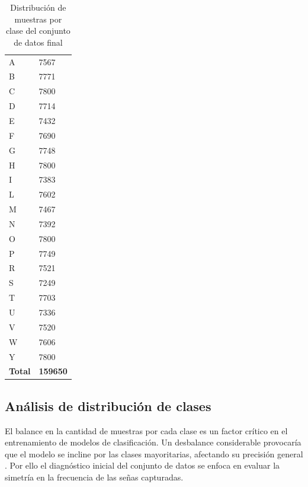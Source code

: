 	\begin{table}[H]
		\centering
		
		
		\caption{Distribución de muestras por clase del conjunto de datos final}
		\label{tab:dataset_general}
		
		\small
		\renewcommand{\arraystretch}{1.2}
		
		\begin{tabular}{|p{3cm}|p{4cm}|}
			\hline
			
			\rowcolor{headerblue}
			\headercell{Clase} &
			\headercell{Número de muestras} \\
			\hline
			
			A & 7567 \\
			B & 7771 \\
			C & 7800 \\
			D & 7714 \\
			E & 7432 \\
			F & 7690 \\
			G & 7748 \\
			H & 7800 \\
			I & 7383 \\
			L & 7602 \\
			M & 7467 \\
			N & 7392 \\
			O & 7800 \\
			P & 7749 \\
			R & 7521 \\
			S & 7249 \\
			T & 7703 \\
			U & 7336 \\
			V & 7520 \\
			W & 7606 \\
			Y & 7800 \\
			\hline
			
			\rowcolor{headerblue}
			\textbf{Total} & \textbf{159650} \\
			\hline
			
		\end{tabular}
		
	\end{table}
	
	
	\subsection{Análisis de distribución de clases}
	
	El balance en la cantidad de muestras por cada clase es un factor crítico en el entrenamiento de modelos de clasificación. Un desbalance considerable provocaría que el modelo se incline por las clases mayoritarias, afectando su precisión general \cite{goodfellow2016deep}. Por ello el diagnóstico inicial del conjunto de datos se enfoca en evaluar la simetría en la frecuencia de las señas capturadas.
	
